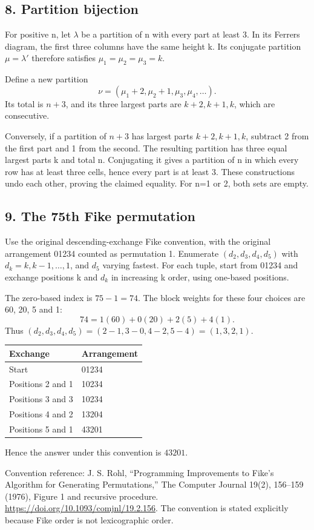 \documentclass[11pt,a4paper]{article}
\begin{document}
\noindent\begin{minipage}{\linewidth}\subsection*{8. Partition bijection}

For positive n, let $\lambda$ be a partition of n with every part at least 3. In its Ferrers diagram, the first three columns have the same height k. Its conjugate partition $\mu=\lambda'$ therefore satisfies $\mu_1=\mu_2=\mu_3=k$.

Define a new partition
\[\nu=(\mu_1+2,\mu_2+1,\mu_3,\mu_4,\ldots).
\]
Its total is $n+3$, and its three largest parts are $k+2,k+1,k$, which are consecutive.

Conversely, if a partition of $n+3$ has largest parts $k+2,k+1,k$, subtract 2 from the first part and 1 from the second. The resulting partition has three equal largest parts k and total n. Conjugating it gives a partition of n in which every row has at least three cells, hence every part is at least 3. These constructions undo each other, proving the claimed equality. For n=1 or 2, both sets are empty.
\end{minipage}\par\medskip
\noindent\begin{minipage}{\linewidth}\subsection*{9. The 75th Fike permutation}

Use the original descending-exchange Fike convention, with the original arrangement 01234 counted as permutation 1. Enumerate $(d_2,d_3,d_4,d_5)$ with $d_k=k,k-1,\ldots,1$, and $d_5$ varying fastest. For each tuple, start from 01234 and exchange positions k and $d_k$ in increasing k order, using one-based positions.

The zero-based index is $75-1=74$. The block weights for these four choices are 60, 20, 5 and 1:
\[74=1(60)+0(20)+2(5)+4(1).
\]
Thus $(d_2,d_3,d_4,d_5)=(2-1,3-0,4-2,5-4)=\boxed{(1,3,2,1)}$.
\begin{center}\renewcommand{\arraystretch}{1.2}\begin{tabular}{ll}\hline Exchange & Arrangement\\\hline
Start & 01234\\
Positions 2 and 1 & 10234\\
Positions 3 and 3 & 10234\\
Positions 4 and 2 & 13204\\
Positions 5 and 1 & 43201\\\hline\end{tabular}\end{center}
Hence the answer under this convention is $\boxed{43201}$.

{\small Convention reference: J. S. Rohl, ``Programming Improvements to Fike's Algorithm for Generating Permutations,'' The Computer Journal 19(2), 156--159 (1976), Figure 1 and recursive procedure. \url{https://doi.org/10.1093/comjnl/19.2.156}. The convention is stated explicitly because Fike order is not lexicographic order.}
\end{minipage}\par\medskip
\end{document}
